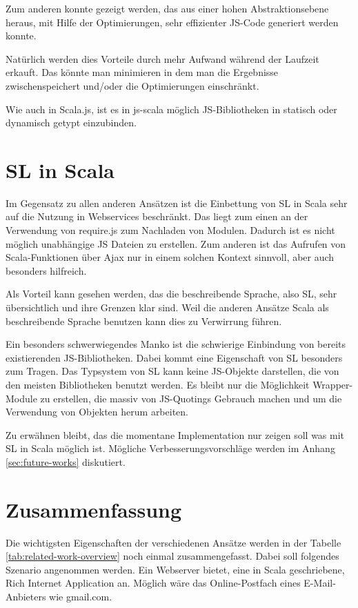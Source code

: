 \documentclass[12pt]{scrreprt}
\begin{document}
Zum anderen konnte gezeigt werden, das aus einer hohen Abstraktionsebene heraus, mit Hilfe der Optimierungen, sehr effizienter JS-Code generiert werden konnte\cite{Richard-Foy2013}.

Natürlich werden dies Vorteile durch mehr Aufwand während der Laufzeit erkauft. Das könnte man minimieren in dem man die Ergebnisse zwischenspeichert und/oder die Optimierungen einschränkt.

Wie auch in Scala.js, ist es in js-scala möglich JS-Bibliotheken in statisch oder dynamisch getypt einzubinden.


\section{SL in Scala}

Im Gegensatz zu allen anderen Ansätzen ist die Einbettung von SL in Scala sehr auf die Nutzung in Webservices beschränkt. Das liegt zum einen an der Verwendung von require.js zum Nachladen von Modulen. Dadurch ist es nicht möglich unabhängige JS Dateien zu erstellen. Zum anderen ist das Aufrufen von Scala-Funktionen über Ajax nur in einem solchen Kontext sinnvoll, aber auch besonders hilfreich.

Als Vorteil kann gesehen werden, das die beschreibende Sprache, also SL, sehr übersichtlich und ihre Grenzen klar sind. Weil die anderen Ansätze Scala als beschreibende Sprache benutzen kann dies zu Verwirrung führen. 

Ein besonders schwerwiegendes Manko ist die schwierige Einbindung von bereits existierenden JS-Bibliotheken. Dabei kommt eine Eigenschaft von SL besonders zum Tragen. Das Typsystem von SL kann keine JS-Objekte darstellen, die von den meisten Bibliotheken benutzt werden. Es bleibt nur die Möglichkeit Wrapper-Module zu erstellen, die massiv von JS-Quotings Gebrauch machen und um die Verwendung von Objekten herum arbeiten.

Zu erwähnen bleibt, das die momentane Implementation nur zeigen soll was mit SL in Scala möglich ist. Mögliche Verbesserungsvorschläge werden im Anhang \ref{sec:future-works} diskutiert.

\section{Zusammenfassung}

Die wichtigsten Eigenschaften der verschiedenen Ansätze werden in der Tabelle \ref{tab:related-work-overview} noch einmal zusammengefasst. Dabei soll folgendes Szenario angenommen werden. Ein Webserver bietet, eine in Scala geschriebene, Rich Internet Application an. Möglich wäre das Online-Postfach eines E-Mail-Anbieters wie gmail.com.
\end{document}
